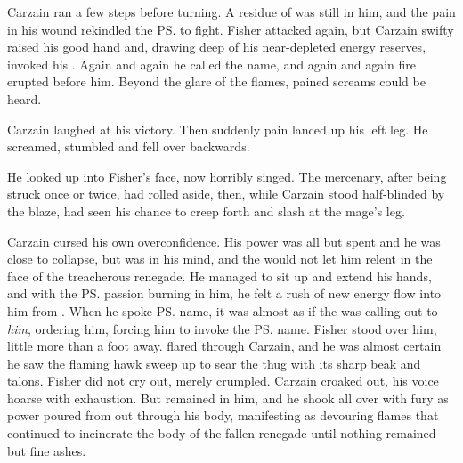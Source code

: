 Carzain ran a few steps before turning. 
A residue of \Izion{} was still in him, and the pain in his wound rekindled the \ps{\sephirah} to fight. 
Fisher attacked again, but Carzain swifty raised his good hand and, drawing deep of his near-depleted energy reserves, invoked his \Sephirah. 
\ta{\Izion! \Izion! \Izion!} 
Again and again he called the name, 
and again and again fire erupted before him. 
Beyond the glare of the flames, pained screams could be heard. 

Carzain laughed at his victory. 
Then suddenly pain lanced up his left leg. 
He screamed, stumbled and fell over backwards. 

He looked up into Fisher's face, now horribly singed. 
The mercenary, after being struck once or twice, had rolled aside, then, while Carzain stood half-blinded by the blaze, had seen his chance to creep forth and slash at the mage's leg. 

Carzain cursed his own overconfidence. 
His power was all but spent and he was close to collapse, but \Izion{} was in his mind, and the \Sephirah{} would not let him relent in the face of the treacherous renegade. 
He managed to sit up and extend his hands, and with the \ps{\Archon} passion burning in him, he felt a rush of new energy flow into him from \iquin{}. 
When he spoke \ps{\Izion} name, it was almost as if the \Sephirah{} was calling out to \emph{him}, ordering him, forcing him to invoke the \ps{\sephirah} name.  
Fisher stood over him, little more than a foot away. 
\Iquin{} flared through Carzain, and he was almost certain he saw the flaming hawk sweep up to sear the thug with its sharp beak and talons. 
Fisher did not cry out, merely crumpled. 
 Carzain croaked out, his voice hoarse with exhaustion. 
But \Izion{} remained in him, and he shook all over with fury as power poured from \iquin{} out through his body, manifesting as devouring flames that continued to incinerate the body of the fallen renegade until nothing remained but fine ashes. 




